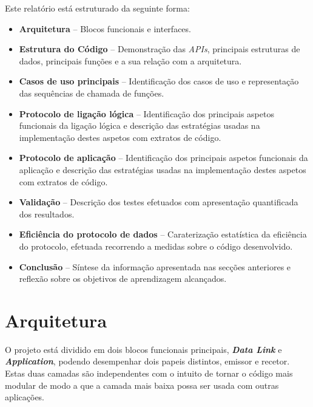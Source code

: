 \documentclass[a4paper,11pt,portuguese]{article}
\begin{document}
    \hfill \break
    \noindent Este relatório está estruturado da seguinte forma:
    \begin{itemize}
        \item \textbf{Arquitetura} -- Blocos funcionais e interfaces.
        
        \item \textbf{Estrutura do Código} -- Demonstração das \textit{APIs}, principais 
        estruturas de dados, principais funções e a sua relação com a arquitetura.

        \item \textbf{Casos de uso principais} -- Identificação dos casos de uso 
        e representação das sequências de chamada de funções.

        \item \textbf{Protocolo de ligação lógica} -- Identificação dos principais
        aspetos funcionais da ligação lógica e descrição das estratégias usadas na
        implementação destes aspetos com extratos de código.

        \item \textbf{Protocolo de aplicação} -- Identificação dos principais
        aspetos funcionais da aplicação e descrição das estratégias usadas na
        implementação destes aspetos com extratos de código.

        \item \textbf{Validação} -- Descrição dos testes efetuados com apresentação
        quantificada dos resultados.

        \item \textbf{Eficiência do protocolo de dados} -- Caraterização estatística 
        da eficiência do protocolo, efetuada recorrendo a medidas sobre o código
        desenvolvido.

        \item \textbf{Conclusão} -- Síntese da informação apresentada nas secções
        anteriores e reflexão sobre os objetivos de aprendizagem alcançados.
        
    \end{itemize}


\section{Arquitetura}
    
    O projeto está dividido em dois blocos funcionais principais, \textbf{\textit{Data Link}} e 
    \textbf{\textit{Application}}, podendo desempenhar dois papeis distintos, emissor e recetor.
    Estas duas camadas são independentes com o intuito de tornar o código mais modular de 
    modo a que a camada mais baixa possa ser usada com outras aplicações. \par
    
\end{document}
